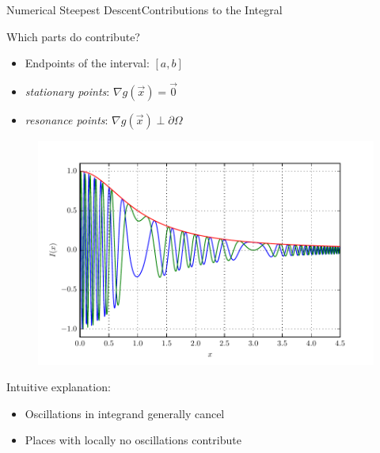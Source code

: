 \documentclass{beamer}
\newcommand{\cemph}[1]{\emph{\color{orange} #1}}
\begin{document}
\begin{frame}{Numerical Steepest Descent}{Contributions to the Integral}
  \begin{minipage}{0.6\linewidth}
    Which parts do contribute?
    \begin{itemize}
      \item Endpoints of the interval: $[a, b]$
      \item \cemph{stationary points}: $\nabla g(\vec{x}) = \vec{0}$
      \item \cemph{resonance points}: $\nabla g(\vec{x}) \perp \partial \Omega$
    \end{itemize}
  \end{minipage}
  \begin{minipage}{0.38\linewidth}
    \begin{figure}
      \centering
      \includegraphics[width=\linewidth]{./fig/oscillatory_example_2.pdf}
    \end{figure}
  \end{minipage}
  Intuitive explanation:
  \begin{itemize}
    \item Oscillations in integrand generally cancel
    \item Places with locally no oscillations contribute
  \end{itemize}
\end{frame}
\end{document}
